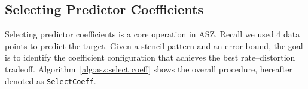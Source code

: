 \subsection{Selecting Predictor Coefficients}\label{sec:asz:select coeff}

Selecting predictor coefficients is a core operation in ASZ.
Recall we used 4 data points to predict the target. Given a stencil pattern and an error bound, the goal is to identify the coefficient configuration that achieves the best rate–distortion tradeoff.
Algorithm~\ref{alg:asz:select coeff} shows the overall procedure, hereafter denoted as \texttt{SelectCoeff}.



